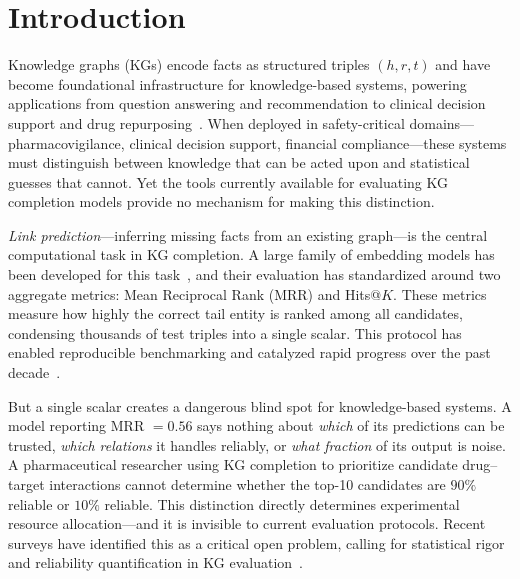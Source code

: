 \section{Introduction}
\label{sec:intro}

Knowledge graphs (KGs) encode facts as structured triples $(h, r, t)$ and have become foundational infrastructure for knowledge-based systems, powering applications from question answering and recommendation to clinical decision support and drug repurposing~\cite{shen2022comprehensive,biswas2023knowledge}.
When deployed in safety-critical domains---pharmacovigilance, clinical decision support, financial compliance---these systems must distinguish between knowledge that can be acted upon and statistical guesses that cannot.
Yet the tools currently available for evaluating KG completion models provide no mechanism for making this distinction.

\emph{Link prediction}---inferring missing facts from an existing graph---is the central computational task in KG completion.
A large family of embedding models has been developed for this task~\cite{bordes2013translating,sun2019rotate,trouillon2016complex,dettmers2018convolutional,balazevic2019tucker,nguyen2018convkb,sun2022hake,le2023knowledge}, and their evaluation has standardized around two aggregate metrics: Mean Reciprocal Rank (MRR) and Hits@$K$.
These metrics measure how highly the correct tail entity is ranked among all candidates, condensing thousands of test triples into a single scalar.
This protocol has enabled reproducible benchmarking and catalyzed rapid progress over the past decade~\cite{wang2017knowledge,rossi2021knowledge,li2023knowledge,liu2022understanding}.

But a single scalar creates a dangerous blind spot for knowledge-based systems.
A model reporting MRR $= 0.56$ says nothing about \emph{which} of its predictions can be trusted, \emph{which relations} it handles reliably, or \emph{what fraction} of its output is noise.
A pharmaceutical researcher using KG completion to prioritize candidate drug--target interactions cannot determine whether the top-10 candidates are $90\%$ reliable or $10\%$ reliable.
This distinction directly determines experimental resource allocation---and it is invisible to current evaluation protocols.
Recent surveys have identified this as a critical open problem, calling for statistical rigor and reliability quantification in KG evaluation~\cite{jarnac2025uncertainty,biswas2023knowledge}.

